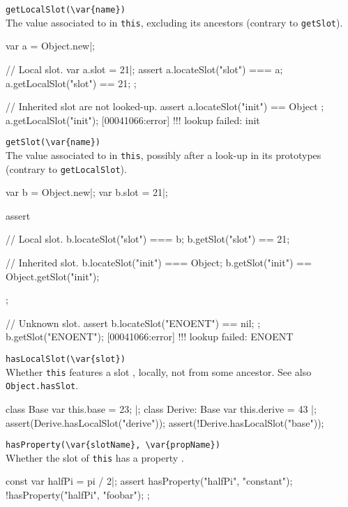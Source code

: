\begin{urbiscriptapi}
\item \lstinline|getLocalSlot(\var{name})|\\
  The value associated to  in \lstinline|this|, excluding
  its ancestors (contrary to \lstinline|getSlot|).
\begin{urbiscript}
var a = Object.new|;

// Local slot.
var a.slot = 21|;
assert
{
  a.locateSlot("slot") === a;
  a.getLocalSlot("slot") == 21;
};

// Inherited slot are not looked-up.
assert { a.locateSlot("init") == Object };
a.getLocalSlot("init");
[00041066:error] !!! lookup failed: init
\end{urbiscript}

\item \lstinline|getSlot(\var{name})|\\
  The value associated to  in \lstinline|this|, possibly
  after a look-up in its prototypes (contrary to
  \lstinline|getLocalSlot|).
\begin{urbiscript}
var b = Object.new|;
var b.slot = 21|;

assert
{
  // Local slot.
  b.locateSlot("slot") === b;
  b.getSlot("slot") == 21;

  // Inherited slot.
  b.locateSlot("init") === Object;
  b.getSlot("init") == Object.getSlot("init");
};

// Unknown slot.
assert { b.locateSlot("ENOENT") == nil; };
b.getSlot("ENOENT");
[00041066:error] !!! lookup failed: ENOENT
\end{urbiscript}

\item \lstinline|hasLocalSlot(\var{slot})|\\
  Whether \lstinline|this| features a slot , locally, not
  from some ancestor.  See also \lstinline|Object.hasSlot|.
\begin{urbiscript}
class Base         { var this.base = 23; } |;
class Derive: Base { var this.derive = 43 } |;
assert(Derive.hasLocalSlot("derive"));
assert(!Derive.hasLocalSlot("base"));
\end{urbiscript}

\item \lstinline|hasProperty(\var{slotName}, \var{propName})|\\
  Whether the slot  of \lstinline|this| has a property
  .
\begin{urbiscript}
const var halfPi = pi / 2|;
assert
{
  hasProperty("halfPi", "constant");
  !hasProperty("halfPi", "foobar");
};
\end{urbiscript}


\end{urbiscriptapi}
